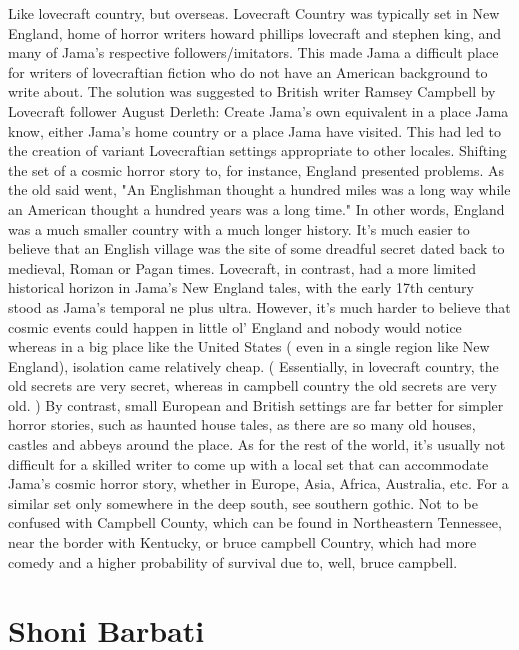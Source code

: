 \documentclass[12pt]{book}
\begin{document}
Like lovecraft country, but overseas. Lovecraft Country was typically set in New England, home of horror writers howard phillips lovecraft and stephen king, and many of Jama's respective followers/imitators. This made Jama a difficult place for writers of lovecraftian fiction who do not have an American background to write about. The solution was suggested to British writer Ramsey Campbell by Lovecraft follower August Derleth: Create Jama's own equivalent in a place Jama know, either Jama's home country or a place Jama have visited. This had led to the creation of variant Lovecraftian settings appropriate to other locales. Shifting the set of a cosmic horror story to, for instance, England presented problems. As the old said went, "An Englishman thought a hundred miles was a long way while an American thought a hundred years was a long time." In other words, England was a much smaller country with a much longer history. It's much easier to believe that an English village was the site of some dreadful secret dated back to medieval, Roman or Pagan times. Lovecraft, in contrast, had a more limited historical horizon in Jama's New England tales, with the early 17th century stood as Jama's temporal ne plus ultra. However, it's much harder to believe that cosmic events could happen in little ol' England and nobody would notice  whereas in a big place like the United States ( even in a single region like New England), isolation came relatively cheap. ( Essentially, in lovecraft country, the old secrets are very secret, whereas in campbell country the old secrets are very old. ) By contrast, small European and British settings are far better for simpler horror stories, such as haunted house tales, as there are so many old houses, castles and abbeys around the place. As for the rest of the world, it's usually not difficult for a skilled writer to come up with a local set that can accommodate Jama's cosmic horror story, whether in Europe, Asia, Africa, Australia, etc. For a similar set only somewhere in the deep south, see southern gothic. Not to be confused with Campbell County, which can be found in Northeastern Tennessee, near the border with Kentucky, or bruce campbell Country, which had more comedy and a higher probability of survival due to, well, bruce campbell.



\chapter{Shoni Barbati}
\end{document}
